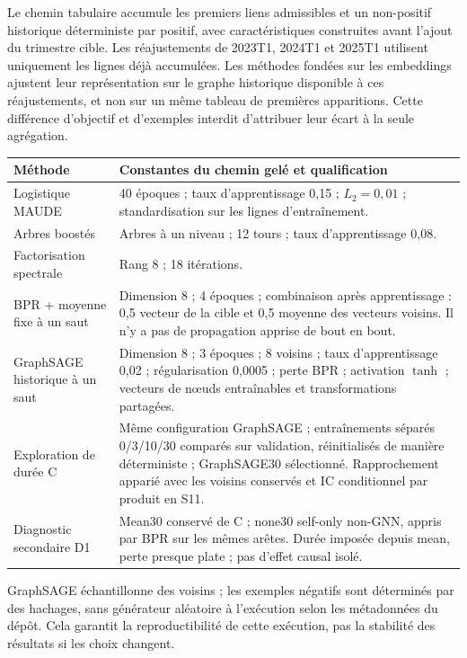 \documentclass[10pt,a4paper]{article}
\begin{document}
Le chemin tabulaire accumule les premiers liens admissibles et un non-positif historique déterministe par positif, avec caractéristiques construites avant l'ajout du trimestre cible. Les réajustements de 2023T1, 2024T1 et 2025T1 utilisent uniquement les lignes déjà accumulées. Les méthodes fondées sur les embeddings ajustent leur représentation sur le graphe historique disponible à ces réajustements, et non sur un même tableau de premières apparitions. Cette différence d'objectif et d'exemples interdit d'attribuer leur écart à la seule agrégation.

\begin{tabularx}{\linewidth}{@{}p{36mm}X@{}}
\toprule
Méthode & Constantes du chemin gelé et qualification\\
\midrule
Logistique MAUDE & 40 époques ; taux d'apprentissage 0,15 ; $L_2=0,01$ ; standardisation sur les lignes d'entraînement.\\
Arbres boostés & Arbres à un niveau ; 12 tours ; taux d'apprentissage 0,08.\\
Factorisation spectrale & Rang 8 ; 18 itérations.\\
BPR + moyenne fixe à un saut & Dimension 8 ; 4 époques ; combinaison après apprentissage : 0,5 vecteur de la cible et 0,5 moyenne des vecteurs voisins. Il n'y a pas de propagation apprise de bout en bout.\\
{\raggedright \mbox{GraphSAGE} historique à un saut\par} & Dimension 8 ; 3 époques ; 8 voisins ; taux d'apprentissage 0,02 ; régularisation 0,0005 ; perte BPR ; activation $\tanh$ ; vecteurs de nœuds entraînables et transformations partagées.\\
Exploration de durée C & Même configuration GraphSAGE ; entraînements séparés 0/3/10/30 comparés sur validation, réinitialisés de manière déterministe ; GraphSAGE30 sélectionné. Rapprochement apparié avec les voisins conservés et IC conditionnel par produit en S11.\\
Diagnostic secondaire D1 & Mean30 conservé de C ; none30 self-only non-GNN, appris par BPR sur les mêmes arêtes. Durée imposée depuis mean, perte presque plate ; pas d'effet causal isolé.\\
\bottomrule
\end{tabularx}

GraphSAGE échantillonne des voisins ; les exemples négatifs sont déterminés par des hachages, sans générateur aléatoire à l'exécution selon les métadonnées du dépôt. Cela garantit la reproductibilité de cette exécution, pas la stabilité des résultats si les choix changent.
\end{document}
